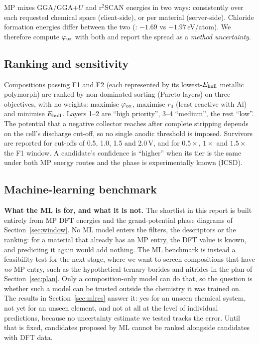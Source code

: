 MP mixes GGA/GGA+$U$ and r$^2$SCAN energies in two ways: consistently over each requested chemical space (client-side), or per material (server-side). Chloride formation energies differ between the two (: $-1.69$ vs $-1.97$\,eV/atom). We therefore compute $\varphi_{\mathrm{ox}}$ with both and report the spread as a \emph{method uncertainty}.

\subsection{Ranking and sensitivity}
Compositions passing F1 and F2 (each represented by its lowest-$E_{\mathrm{hull}}$ metallic polymorph) are ranked by non-dominated sorting (Pareto layers) on three objectives, with no weights: maximise $\varphi_{\mathrm{ox}}$, maximise $r_0$ (least reactive with Al) and minimise $E_{\mathrm{hull}}$. Layers 1--2 are ``high priority'', 3--4 ``medium'', the rest ``low''. The potential that a negative collector reaches after complete stripping depends on the cell's discharge cut-off, so no single anodic threshold is imposed. Survivors are reported for cut-offs of 0.5, 1.0, 1.5 and 2.0\,V, and for $0.5\times$, $1\times$ and $1.5\times$ the F1 window. A candidate's confidence is ``higher'' when its tier is the same under both MP energy routes and the phase is experimentally known (ICSD).

\subsection{Machine-learning benchmark}
\label{sec:ml}

\textbf{What the ML is for, and what it is not.} The shortlist in this report is built entirely from MP DFT energies and the grand-potential phase diagrams of Section~\ref{sec:window}. No ML model enters the filters, the descriptors or the ranking: for a material that already has an MP entry, the DFT value is known, and predicting it again would add nothing. The ML benchmark is instead a feasibility test for the next stage, where we want to screen compositions that have \emph{no} MP entry, such as the hypothetical ternary borides and nitrides in the plan of Section~\ref{sec:plan}. Only a composition-only model can do that, so the question is whether such a model can be trusted outside the chemistry it was trained on. The results in Section~\ref{sec:mlres} answer it: yes for an unseen chemical system, not yet for an unseen element, and not at all at the level of individual predictions, because no uncertainty estimate we tested tracks the error. Until that is fixed, candidates proposed by ML cannot be ranked alongside candidates with DFT data.

